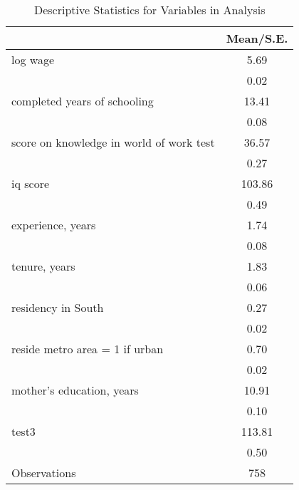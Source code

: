 \begin{table}[htbp]\centering \caption{Descriptive Statistics for Variables in Analysis} \begin{tabular}{l*{1}{c}} \hline\hline
                    &   Mean/S.E.\\
\hline
log wage            &        5.69\\
                    &        0.02\\
completed years of schooling&       13.41\\
                    &        0.08\\
score on knowledge in world of work test&       36.57\\
                    &        0.27\\
iq score            &      103.86\\
                    &        0.49\\
experience, years   &        1.74\\
                    &        0.08\\
tenure, years       &        1.83\\
                    &        0.06\\
residency in South  &        0.27\\
                    &        0.02\\
reside metro area = 1 if urban&        0.70\\
                    &        0.02\\
mother's education, years&       10.91\\
                    &        0.10\\
test3               &      113.81\\
                    &        0.50\\
\hline
Observations        &         758\\
\hline\hline
\end{tabular}
\end{table}
